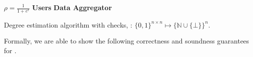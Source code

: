 \begin{algorithm}[t]

  $\rho=\frac{1}{1+e^{\epsilon}}$\;
	\textbf{Users}\;
	\textbf{Data Aggregator}\;
	\caption[Degree estimation algorithm with checks, \DegRRCheck.]
	{Degree estimation algorithm with checks, \DegRRCheck: $\{0,1\}^{n\times n}\mapsto \{\mathbb{N}\cup \{\bot\}\}^n$.}\label{chap4-alg:degrrcheck}
\end{algorithm}

%
Formally, we are able to show the following correctness and soundness guarantees for \DegRRCheck{}.

